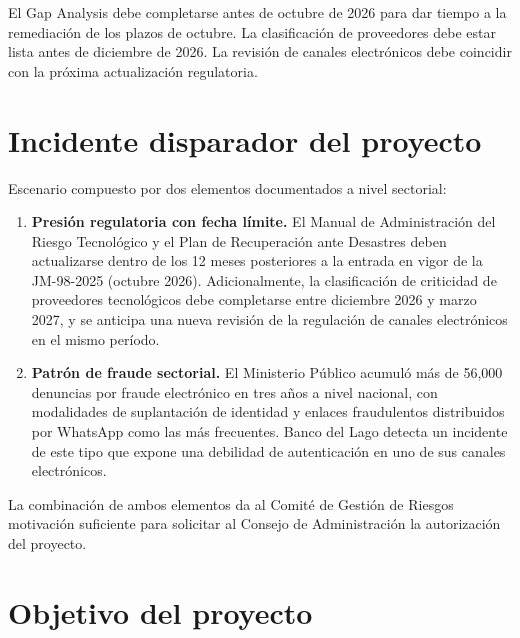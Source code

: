 \documentclass[11pt,a4paper]{article}
\begin{document}
	\begin{warnbox}
		El Gap Analysis debe completarse antes de octubre de 2026 para dar tiempo a la remediación de los plazos de octubre. La clasificación de proveedores debe estar lista antes de diciembre de 2026. La revisión de canales electrónicos debe coincidir con la próxima actualización regulatoria.
	\end{warnbox}
	
	
	\section{Incidente disparador del proyecto}
	
	Escenario compuesto por dos elementos documentados a nivel sectorial:
	
	\begin{enumerate}[leftmargin=1.5em]
		\item \textbf{Presión regulatoria con fecha límite.} El Manual de Administración del Riesgo Tecnológico y el Plan de Recuperación ante Desastres deben actualizarse dentro de los 12 meses posteriores a la entrada en vigor de la JM-98-2025 (octubre 2026). Adicionalmente, la clasificación de criticidad de proveedores tecnológicos debe completarse entre diciembre 2026 y marzo 2027, y se anticipa una nueva revisión de la regulación de canales electrónicos en el mismo período.
		\item \textbf{Patrón de fraude sectorial.} El Ministerio Público acumuló más de 56,000 denuncias por fraude electrónico en tres años a nivel nacional, con modalidades de suplantación de identidad y enlaces fraudulentos distribuidos por WhatsApp como las más frecuentes. Banco del Lago detecta un incidente de este tipo que expone una debilidad de autenticación en uno de sus canales electrónicos.
	\end{enumerate}
	
	La combinación de ambos elementos da al Comité de Gestión de Riesgos motivación suficiente para solicitar al Consejo de Administración la autorización del proyecto.
	
	
	\section{Objetivo del proyecto}
	
\end{document}
